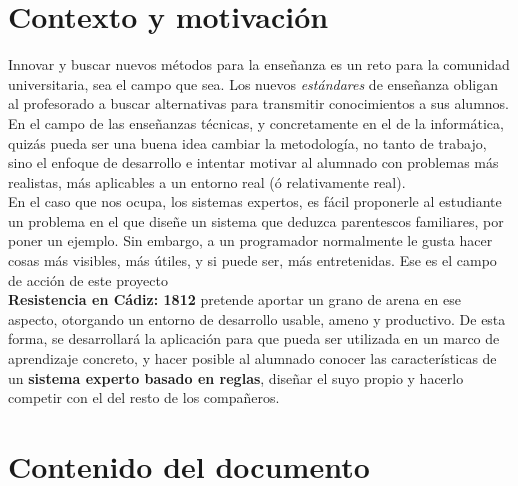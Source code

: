 \section{Contexto y motivación}

Innovar y buscar nuevos métodos para la enseñanza es un reto para la comunidad universitaria,
sea el campo que sea. Los nuevos \textit{estándares} de enseñanza obligan al profesorado a buscar
alternativas para transmitir conocimientos a sus alumnos.\\

En el campo de las enseñanzas técnicas, y concretamente en el de la informática, quizás pueda
ser una buena idea cambiar la metodología, no tanto de trabajo, sino el enfoque de desarrollo e 
intentar motivar al alumnado con problemas más realistas, más aplicables a un entorno real (ó 
relativamente real).\\

En el caso que nos ocupa, los sistemas expertos, es fácil proponerle al estudiante un problema en 
el que diseñe un sistema que deduzca parentescos familiares, por poner un ejemplo. Sin embargo, 
a un programador normalmente le gusta hacer cosas más visibles, más útiles, y si puede ser, más
entretenidas. Ese es el campo de acción de este proyecto\\

\textbf{Resistencia en Cádiz: 1812} pretende aportar un grano de arena en ese aspecto, otorgando
un entorno de desarrollo usable, ameno y productivo. De esta forma, se desarrollará la aplicación
para que pueda ser utilizada en un marco de aprendizaje concreto, y hacer posible al alumnado
conocer las características de un \textbf{sistema experto basado en reglas}, diseñar el suyo
propio y hacerlo competir con el del resto de los compañeros.

\section{Contenido del documento}
